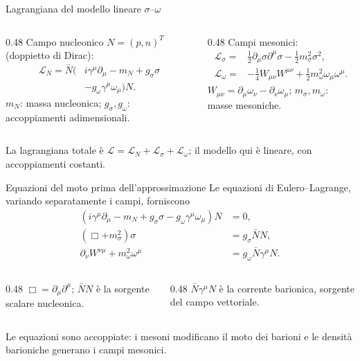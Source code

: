 \begin{frame}{Lagrangiana del modello lineare $\sigma$--$\omega$}
\small
\begin{columns}[T,onlytextwidth]
\begin{column}{0.48\textwidth}
Campo nucleonico $N=(p,n)^T$ (doppietto di Dirac):
\[
 \begin{aligned}
 \mathcal L_N=\bar N\big(&i\gamma^\mu\partial_\mu-m_N
 +g_\sigma\sigma\\
 &-g_\omega\gamma^\mu\omega_\mu\big)N.
 \end{aligned}
\]
$m_N$: massa nucleonica; $g_\sigma,g_\omega$: accoppiamenti adimensionali.
\end{column}
\begin{column}{0.48\textwidth}
Campi mesonici:
\[
 \begin{aligned}
 \mathcal L_\sigma={}&\frac12\partial_\mu\sigma\partial^\mu\sigma
 -\frac12m_\sigma^2\sigma^2,\\
 \mathcal L_\omega={}&-\frac14W_{\mu\nu}W^{\mu\nu}
 +\frac12m_\omega^2\omega_\mu\omega^\mu.
 \end{aligned}
\]
$W_{\mu\nu}=\partial_\mu\omega_\nu-\partial_\nu\omega_\mu$; $m_\sigma,m_\omega$: masse mesoniche.
\end{column}
\end{columns}
\medskip
La lagrangiana totale è $\mathcal L=\mathcal L_N+\mathcal L_\sigma+\mathcal L_\omega$; il modello qui è lineare, con accoppiamenti costanti.
\end{frame}

\begin{frame}{Equazioni del moto prima dell'approssimazione}
\small
Le equazioni di Eulero--Lagrange, variando separatamente i campi, forniscono
\[
 \begin{aligned}
 (i\gamma^\mu\partial_\mu-m_N+g_\sigma\sigma
 -g_\omega\gamma^\mu\omega_\mu)N&=0,\\
 (\Box+m_\sigma^2)\sigma&=g_\sigma\bar NN,\\
 \partial_\nu W^{\nu\mu}+m_\omega^2\omega^\mu
 &=g_\omega\bar N\gamma^\mu N.
 \end{aligned}
\]
\begin{columns}[T,onlytextwidth]
\begin{column}{0.48\textwidth}
$\Box=\partial_\mu\partial^\mu$; $\bar NN$ è la sorgente scalare nucleonica.
\end{column}
\begin{column}{0.48\textwidth}
$\bar N\gamma^\mu N$ è la corrente barionica, sorgente del campo vettoriale.
\end{column}
\end{columns}
\medskip
Le equazioni sono accoppiate: i mesoni modificano il moto dei barioni e le densità barioniche generano i campi mesonici.
\end{frame}

